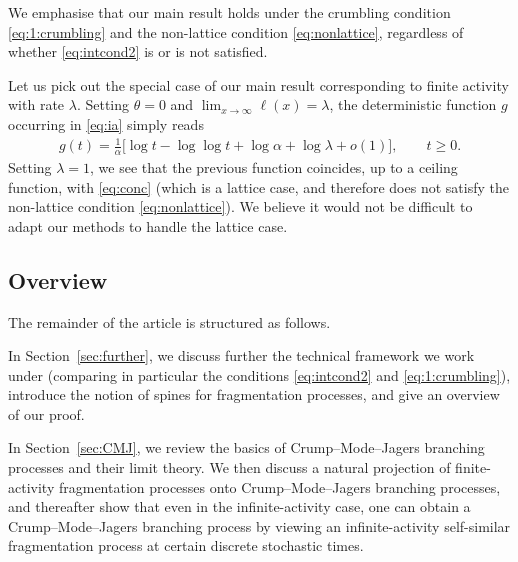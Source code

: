\documentclass[a4,12pt]{amsart}
\numberwithin{equation}{section}
\begin{document}
	We emphasise that our main result holds under the crumbling 
	condition \eqref{eq:1:crumbling} and the non-lattice 
	condition \eqref{eq:nonlattice}, regardless of whether \eqref{eq:intcond2} is or is not satisfied. 

	Let us pick out the special case of our main result corresponding to finite activity with rate $\lambda$.
	Setting $\theta = 0$ and $\lim_{x \to \infty} \ell(x) = \lambda$, 
	the deterministic function $g$ occurring in \eqref{eq:ia} simply reads
	\begin{align} \label{eq:fa}
		g(t) =  \frac{1}{\alpha} \big[ \log t - \log \log t + \log \alpha + \log \lambda + o(1) \big], 
		\qquad t\geq 0.
	\end{align}
	Setting $\lambda = 1$, we see that the previous function coincides, up to a ceiling function, 
	with \eqref{eq:conc} (which is a lattice case, and therefore does not satisfy the non-lattice condition \eqref{eq:nonlattice}).
	We believe it would not be difficult to adapt our methods to handle the lattice case.

	
 

\subsection{Overview}

	The remainder of the article is structured as follows.

    In Section~\ref{sec:further}, we discuss further the technical framework we work under (comparing in particular the conditions  \eqref{eq:intcond2} and \eqref{eq:1:crumbling}), introduce the notion of spines for fragmentation processes, and give an overview of our proof.
    
	In Section~\ref{sec:CMJ}, we review the basics of Crump–Mode–Jagers branching processes and their limit theory. 
	We then discuss a natural projection of finite-activity fragmentation processes onto Crump–Mode–Jagers branching processes, 
	and thereafter show that even in the infinite-activity case, one can obtain a Crump–Mode–Jagers branching process 
	by viewing an infinite-activity self-similar fragmentation process at certain discrete stochastic times.
\end{document}
